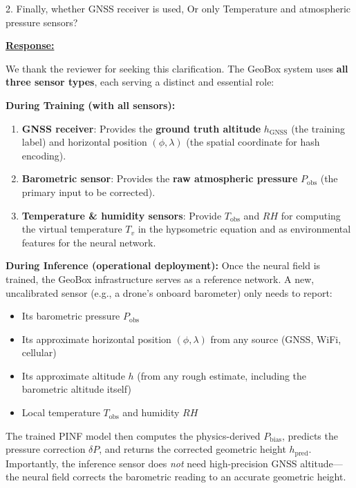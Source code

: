 \newpage

\begin{cmtthree}{}{}
2. Finally, whether GNSS receiver is used, Or only Temperature and atmospheric pressure sensors?

\end{cmtthree}
\vspace{0.1cm}
\noindent
\underline{\textbf{Response:}}
\vspace{0.2cm}

We thank the reviewer for seeking this clarification. The GeoBox system uses \textbf{all three sensor types}, each serving a distinct and essential role:

\textbf{During Training (with all sensors):}
\begin{enumerate}
    \item \textbf{GNSS receiver}: Provides the \textbf{ground truth altitude} $h_{\text{GNSS}}$ (the training label) and horizontal position $(\phi, \lambda)$ (the spatial coordinate for hash encoding).
    \item \textbf{Barometric sensor}: Provides the \textbf{raw atmospheric pressure} $P_{\text{obs}}$ (the primary input to be corrected).
    \item \textbf{Temperature \& humidity sensors}: Provide $T_{\text{obs}}$ and $RH$ for computing the virtual temperature $T_v$ in the hypsometric equation and as environmental features for the neural network.
\end{enumerate}

\textbf{During Inference (operational deployment):}
Once the neural field is trained, the GeoBox infrastructure serves as a reference network. A new, uncalibrated sensor (e.g., a drone's onboard barometer) only needs to report:
\begin{itemize}
    \item Its barometric pressure $P_{\text{obs}}$
    \item Its approximate horizontal position $(\phi, \lambda)$ from any source (GNSS, WiFi, cellular)
    \item Its approximate altitude $h$ (from any rough estimate, including the barometric altitude itself)
    \item Local temperature $T_{\text{obs}}$ and humidity $RH$
\end{itemize}
The trained PINF model then computes the physics-derived $P_{\text{bias}}$, predicts the pressure correction $\delta P$, and returns the corrected geometric height $h_{\text{pred}}$. Importantly, the inference sensor does \emph{not} need high-precision GNSS altitude---the neural field corrects the barometric reading to an accurate geometric height.

